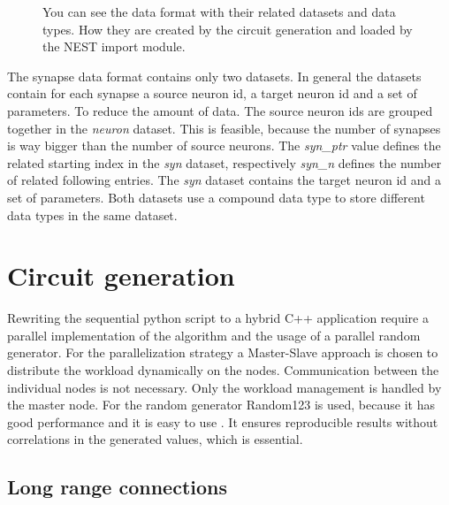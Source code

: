 \begin{figure}[ht!]
\begin{center}
{       }
    	   \end{center}
    	\caption{%
        You can see the data format with their related datasets and data types. 
        How they are created by the circuit generation and loaded by the NEST import module.
     }%
   \label{fig:atlas}
   \end{figure}
The synapse data format contains only two datasets. In general the datasets contain for each synapse
a source neuron id, a target neuron id and a set of parameters. To reduce the amount of data.
The source neuron ids are grouped together in the \emph{neuron} dataset. This is feasible, because
the number of synapses is way bigger than the number of source neurons. The \emph{syn\_ptr} value 
defines the related starting index in the \emph{syn} dataset, respectively \emph{syn\_n} defines the
number of related following entries.
The \emph{syn} dataset contains the target neuron id and a set of parameters.
Both datasets use a compound data type to store different data types in the same dataset.

\newpage
\section{Circuit generation}
Rewriting the sequential python script to a hybrid C++ application require a parallel implementation of the algorithm and the usage of 
a parallel random generator. For the parallelization strategy a Master-Slave approach is chosen to distribute the workload dynamically on the nodes.
Communication between the individual nodes is not necessary. Only the workload management is handled by the master node.
For the random generator Random123 is used, because it has good performance and it is easy to use \cite{salmon2011parallel}.
It ensures reproducible results without correlations in the generated values, which is essential.


\subsection{Long range connections}

